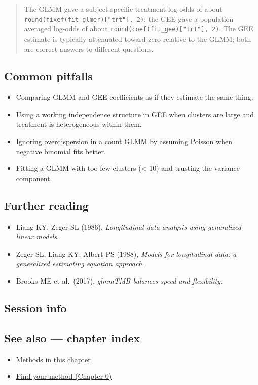 \documentclass[
]{article}
\newenvironment{Shaded}{\begin{snugshade}}{\end{snugshade}}
\providecommand{\tightlist}{%
  \setlength{\itemsep}{0pt}\setlength{\parskip}{0pt}}
\begin{document}
\begin{quote}
The GLMM gave a subject-specific treatment log-odds of about
\texttt{round(fixef(fit\_glmer){[}"trt"{]},\ 2)}; the GEE gave a
population- averaged log-odds of about
\texttt{round(coef(fit\_gee){[}"trt"{]},\ 2)}. The GEE estimate is
typically attenuated toward zero relative to the GLMM; both are correct
answers to different questions.
\end{quote}

\subsection{Common pitfalls}\label{common-pitfalls}

\begin{itemize}
\tightlist
\item
  Comparing GLMM and GEE coefficients as if they estimate the same
  thing.
\item
  Using a working independence structure in GEE when clusters are large
  and treatment is heterogeneous within them.
\item
  Ignoring overdispersion in a count GLMM by assuming Poisson when
  negative binomial fits better.
\item
  Fitting a GLMM with too few clusters (\textless{} 10) and trusting the
  variance component.
\end{itemize}

\subsection{Further reading}\label{further-reading}

\begin{itemize}
\tightlist
\item
  Liang KY, Zeger SL (1986), \emph{Longitudinal data analysis using
  generalized linear models}.
\item
  Zeger SL, Liang KY, Albert PS (1988), \emph{Models for longitudinal
  data: a generalized estimating equation approach}.
\item
  Brooks ME et al.~(2017), \emph{glmmTMB balances speed and
  flexibility}.
\end{itemize}

\subsection{Session info}\label{session-info}

\begin{Shaded}
\begin{Highlighting}[]

\end{Highlighting}
\end{Shaded}

\subsection{See also --- chapter index}\label{see-also-chapter-index}

\begin{itemize}
\tightlist
\item
  \href{../index.Rmd}{Methods in this chapter}
\item
  \href{../../../ch00-find-your-method.Rmd}{Find your method (Chapter
  0)}
\end{itemize}
\end{document}
